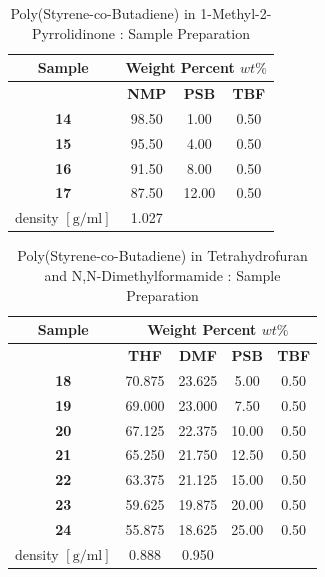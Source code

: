 \begin{table}[!th]
\centering
\caption[Poly(Styrene-co-Butadiene) in 1-Methyl-2-Pyrrolidinone : Sample Preparation]{Poly(Styrene-co-Butadiene) in 1-Methyl-2-Pyrrolidinone : Sample Preparation}
\begin{tabular}{cccc}
\hline
\textbf{Sample} & \multicolumn{3}{c}{\textbf{Weight Percent} $wt\%$} \\
\hline
{}          & \textbf{NMP} & \textbf{PSB} & \textbf{TBF} \\
\textbf{14} & 98.50        &  1.00        & 0.50         \\
\textbf{15} & 95.50        &  4.00        & 0.50         \\
\textbf{16} & 91.50        &  8.00        & 0.50         \\
\textbf{17} & 87.50        & 12.00        & 0.50         \\
\hline
density $[\textrm{g} / \textrm{ml}]$
   & 1.027        & {}           & {}           \\
\hline
\end{tabular}
\label{tab:PSBinNMP}
\end{table}

\begin{table}[!th]
\centering
\caption[Poly(Styrene-co-Butadiene) in Tetrahydrofuran and N,N-Dimethylformamide : Sample Preparation]{Poly(Styrene-co-Butadiene) in Tetrahydrofuran and N,N-Dimethylformamide : Sample Preparation}
\begin{tabular}{ccccc}
\hline
\textbf{Sample} & \multicolumn{4}{c}{\textbf{Weight Percent} $wt\%$} \\
\hline
{}          & \textbf{THF} & \textbf{DMF} & \textbf{PSB} & \textbf{TBF} \\
\textbf{18} & 70.875       & 23.625       &  5.00        & 0.50         \\
\textbf{19} & 69.000       & 23.000       &  7.50        & 0.50         \\
\textbf{20} & 67.125       & 22.375       & 10.00        & 0.50         \\
\textbf{21} & 65.250       & 21.750       & 12.50        & 0.50         \\
\textbf{22} & 63.375       & 21.125       & 15.00        & 0.50         \\
\textbf{23} & 59.625       & 19.875       & 20.00        & 0.50         \\
\textbf{24} & 55.875       & 18.625       & 25.00        & 0.50         \\
\hline
density $[\textrm{g} / \textrm{ml}]$
   & 0.888        & 0.950        & {}           & {}           \\
\hline
\end{tabular}
\label{tab:PSBinTHFnDMF}
\end{table}

